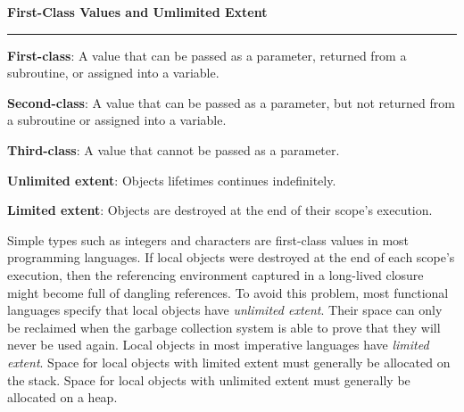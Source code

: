 \nopagenumbers
{\bf First-Class Values and Umlimited Extent}
\vskip 1mm
\hrule

\vskip 6pt
{\bf First-class}: A value that can be passed as a parameter, returned from a subroutine, or assigned into a variable.

\vskip 6pt
{\bf Second-class}: A value that can be passed as a parameter, but not returned from a subroutine or assigned into a variable.

\vskip 6pt
{\bf Third-class}: A value that cannot be passed as a parameter.

\vskip 6pt
{\bf Unlimited extent}: Objects lifetimes continues indefinitely.

\vskip 6pt
{\bf Limited extent}: Objects are destroyed at the end of their scope's execution.

\vskip 6pt
Simple types such as integers and characters are first-class values in most programming languages. If local objects were destroyed at the end of each scope's execution, then the referencing environment captured in a long-lived closure might become full of dangling references. To avoid this problem, most functional languages specify that local objects have {\it unlimited extent}. Their space can only be reclaimed when the garbage collection system is able to prove that they will never be used again. Local objects in most imperative languages have {\it limited extent}. Space for local objects with limited extent must generally be allocated on the stack. Space for local objects with unlimited extent must generally be allocated on a heap.

\vfill\eject
\bye
